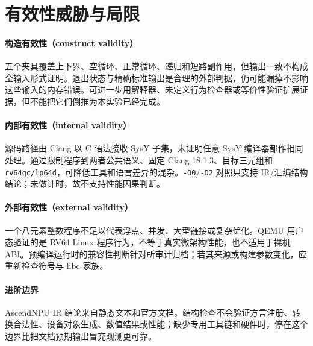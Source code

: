\section{有效性威胁与局限}
\label{sec:threats}

\paragraph{构造有效性（construct validity）}
五个夹具覆盖上下界、空循环、正常循环、递归和短路副作用，但输出一致不构成全输入形式证明。退出状态与精确标准输出是合理的外部判据，仍可能漏掉不影响这些输入的内存错误。可进一步用解释器、未定义行为检查器或等价性验证扩展证据，但不能把它们倒推为本实验已经完成。

\paragraph{内部有效性（internal validity）}
源码路径由 Clang 以 C 语法接收 SysY 子集，未证明任意 SysY 编译器都作相同处理。通过限制程序到两者公共语义、固定 Clang 18.1.3、目标三元组和 \texttt{rv64gc/lp64d}，可降低工具和语言差异的混杂。\texttt{-O0}/\texttt{-O2} 对照只支持 IR/汇编结构结论；未做计时，故不支持性能因果判断。

\paragraph{外部有效性（external validity）}
一个八元素整数程序不足以代表浮点、并发、大型链接或复杂优化。QEMU 用户态验证的是 RV64 Linux 程序行为，不等于真实微架构性能，也不适用于裸机 ABI。预编译运行时的兼容性判断针对所审计归档；若其来源或构建参数变化，应重新检查符号与 libc 家族。

\paragraph{进阶边界}
AscendNPU IR 结论来自静态文本和官方文档。结构检查不会验证方言注册、转换合法性、设备对象生成、数值结果或性能；缺少专用工具链和硬件时，停在这个边界比把文档预期输出冒充观测更可靠。
